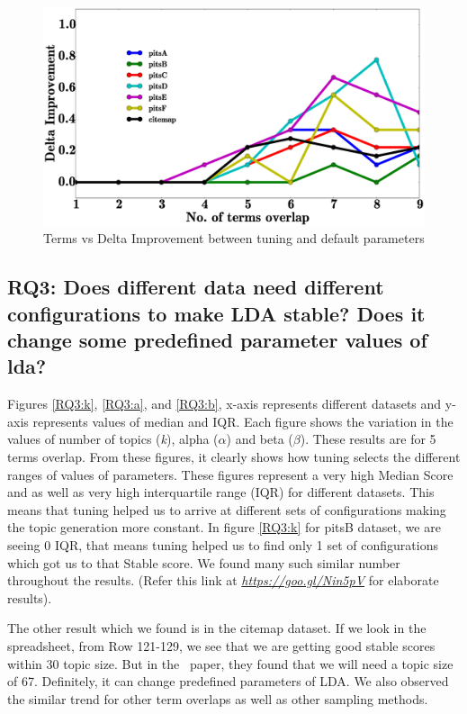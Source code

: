 \documentclass[conference]{IEEEtran}
\theoremstyle{break}
\begin{document}
\begin{center}
\begin{figure}[!htb]
  \includegraphics[width=\linewidth]{./fig/tuned_delta_vem.eps}
  \caption{Terms vs Delta Improvement between tuning and default parameters}
  \label{fig:delta}
\end{figure}
\end{center}

\subsection{\textbf{RQ3: Does different data need different configurations to make LDA stable? Does it change some predefined parameter values of lda?}}

Figures \ref{RQ3:k}, \ref{RQ3:a}, and \ref{RQ3:b}, x-axis represents different datasets and y-axis represents values of median and IQR. Each figure shows the variation in the values of number of topics (\textit{k}), alpha ($\alpha$) and beta ($\beta$). These results are for 5 terms overlap. From these figures, it clearly shows how tuning selects the different ranges of values of parameters. These figures represent a very high Median Score and as well as very high interquartile range (IQR) for different datasets. This means that tuning helped us to arrive at different sets of configurations making the topic generation more constant. In figure \ref{RQ3:k} for pitsB dataset, we are seeing 0 IQR, that means tuning helped us to find only 1 set of configurations which got us to that Stable score. We found many such similar number throughout the results. (Refer this link at \href{https://goo.gl/Nin5pV}{\textit{https://goo.gl/Nin5pV}} for elaborate results).

The other result which we found is in the citemap dataset. If we look in the spreadsheet, from Row 121-129, we see that we are getting good stable scores within 30 topic size. But in the~\cite{garousi2016citations} paper, they found that we will need a topic size of 67. Definitely, it can change predefined parameters of LDA.
We also observed the similar trend for other term overlaps as well as other sampling methods.
\end{document}
